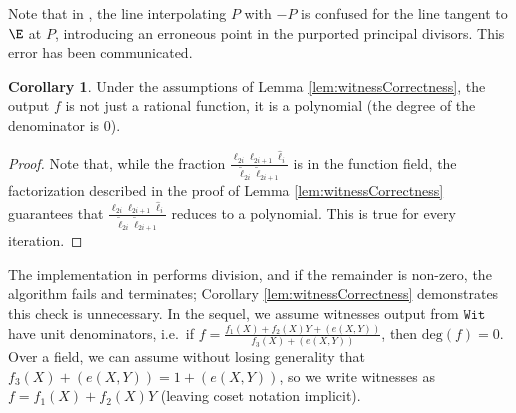 \documentclass[11pt,letterpaper]{article}
\theoremstyle{definition}
\newtheorem{corollary}[theorem]{Corollary}
\newcommand{\6}{\mathbf}
\newcommand{\7}{\mathcal}
\begin{document}
Note that in \cite{Kayaba}, the line interpolating $P$ with $-P$ is confused for the line tangent to $\E$ at $P$, introducing an erroneous point in the purported principal divisors. This error has been communicated. 













\begin{corollary}
Under the assumptions of Lemma \ref{lem:witnessCorrectness}, the output $f$ is not just a rational function, it is a polynomial (the degree of the denominator is $0$).
\end{corollary}
\begin{proof}
Note that, while the fraction $\frac{\ell_{2i}\ell_{2i+1}\widehat{\ell}_i}{\widetilde{\ell}_{2i}\widetilde{\ell}_{2i+1}}$ is in the function field, the factorization described in the proof of Lemma \ref{lem:witnessCorrectness} guarantees that $\frac{\ell_{2i}\ell_{2i+1}\widehat{\ell}_i}{\widetilde{\ell}_{2i}\widetilde{\ell}_{2i+1}}$ reduces to a polynomial. This is true for every iteration. 
\end{proof}

The implementation in \cite{Kayaba} performs division, and if the remainder is non-zero, the algorithm fails and terminates; Corollary \ref{lem:witnessCorrectness} demonstrates this check is unnecessary.
In the sequel, we assume witnesses output from $\texttt{Wit}$ have unit denominators, i.e.\ if $f = \frac{f_1(X) + f_2(X)Y + (e(X,Y))}{f_3(X) + (e(X,Y))}$, then $\text{deg}(f) = 0$. Over a field, we can assume without losing generality that $f_3(X) + (e(X,Y)) = 1 + (e(X,Y))$, so we write witnesses as $f = f_1(X) + f_2(X)Y$ (leaving coset notation implicit).
\end{document}
